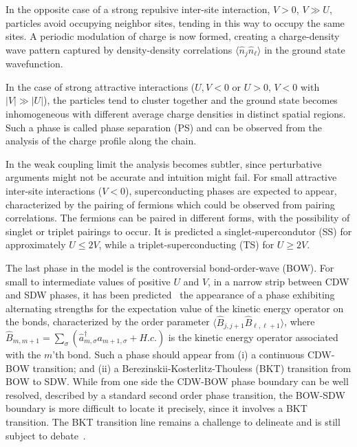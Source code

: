 \documentclass[prb,reprint,showpacs,twocolumn,superscriptaddress]{revtex4-2}
\newcommand{\ad}[1]{\hat a^{\dagger}_{#1}}
\begin{document}
In the opposite case of a strong repulsive inter-site interaction, $V>0$, $V \gg U$, particles avoid
occupying neighbor sites, tending in this way to occupy the same sites. 
A periodic modulation of charge is now formed, creating  a charge-density wave pattern captured  
by density-density correlations $\langle \hat n_j \hat n_\ell \rangle$ in the ground state wavefunction.

In the case of strong attractive interactions ($U,V<0$ or $U>0$, $V<0$ with $|V|\gg |U|$), 
the particles tend to cluster together and the ground state becomes inhomogeneous with different 
average charge densities in distinct spatial regions. 
Such a phase is called phase separation (PS) and can be observed from the analysis of the charge 
profile along the chain.
 
In the weak coupling limit the analysis becomes subtler, since perturbative arguments might not be 
accurate and intuition might fail.
For small attractive inter-site interactions ($V<0$), superconducting phases are expected to appear, 
characterized by the pairing of fermions which could be observed from pairing correlations. 
The fermions can be paired in different forms, with the possibility of singlet or triplet pairings to occur. 
It is predicted \cite{nakamura00,lin00} a singlet-supercondutor (SS) for approximately $U\leq 2V$, while a triplet-superconducting (TS) for $U \geq 2V$.

The last phase in the model is the controversial bond-order-wave (BOW). 
For small to intermediate values  of positive $U$ and $V$, in a narrow strip between CDW and SDW phases, 
it has been 
predicted~\cite{nakamura00,sengupta02,zhang04,dalmonte14,jeckelmann02,ejima07,sandvik04} 
the appearance of a phase exhibiting alternating  strengths for the expectation value of 
the kinetic energy operator on the bonds, characterized by the order parameter 
$\langle \hat B_{j,j+1} \hat B_{\ell,\ell+1}\rangle$,
where 
$\hat B_{m,m+1} = \sum_{\sigma}(\ad{m,\sigma}a_{m+1,\sigma} + H.c.)$
is the  kinetic energy operator associated with the $m$'th bond.
Such a phase should appear from (i) a continuous CDW-BOW transition; 
and (ii) a Berezinskii-Kosterlitz-Thouless (BKT)   transition from BOW to SDW. 
While from one side the CDW-BOW phase boundary can be  well resolved, 
described by a standard second order phase transition, 
the BOW-SDW boundary is more difficult to locate it precisely, since it involves a BKT transition.
The BKT transition line remains a challenge to delineate and is still subject to debate~\cite{sengupta02,zhang04,ejima07,sandvik04,dalmonte14}. 
 
\end{document}
